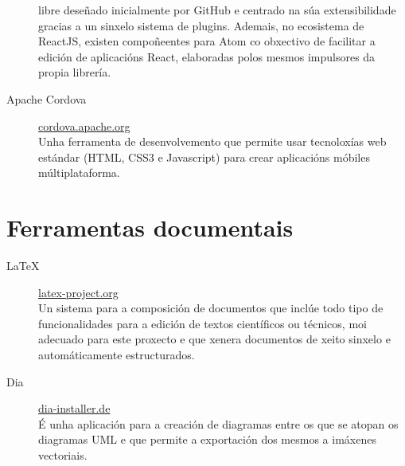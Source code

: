 \begin{description}
libre 
deseñado inicialmente por GitHub e centrado na súa extensibilidade gracias a un 
sinxelo sistema de plugins. Ademais, no ecosistema de ReactJS, existen 
compoñeentes para Atom co obxectivo de facilitar a edición de aplicacións React, 
elaboradas polos mesmos impulsores da propia librería.
   \item [Apache Cordova] 
\href{https://cordova.apache.org/}{cordova.apache.org}\\ Unha 
ferramenta de desenvolvemento que permite usar tecnoloxías web estándar (HTML, 
CSS3 e Javascript) para crear aplicacións móbiles múltiplataforma.

  \end{description}

  \section{Ferramentas documentais}

  \begin{description}
   \item [LaTeX] \href{https://www.latex-project.org/}{latex-project.org}\\ 
Un sistema para a 
composición de documentos que inclúe todo tipo de funcionalidades para a edición 
de textos científicos ou técnicos, moi adecuado para este proxecto e que xenera 
documentos de xeito sinxelo e automáticamente estructurados.
   \item [Dia] \href{http://dia-installer.de/}{dia-installer.de}\\ É unha 
aplicación para a 
creación de diagramas entre os que se atopan os diagramas UML e que permite a 
exportación dos mesmos a imáxenes vectoriais.
  \end{description}
